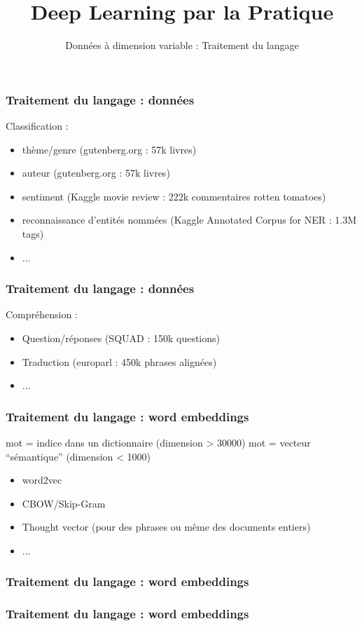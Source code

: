 \documentclass{formation}
\title{Deep Learning par la Pratique}
\subtitle{Données à dimension variable : Traitement du langage}
\begin{document}
\maketitle

\begin{frame}
  \frametitle{Traitement du langage : données}
  Classification :
  \begin{itemize}
  \item thème/genre (gutenberg.org : 57k livres)
  \item auteur (gutenberg.org : 57k livres)
  \item sentiment (Kaggle movie review : 222k commentaires rotten tomatoes)
  \item reconnaissance d'entités nommées (Kaggle Annotated Corpus for NER : 1.3M tags)
  \item ...
  \end{itemize}
\end{frame}

\begin{frame}
  \frametitle{Traitement du langage : données}
  Compréhension :
  \begin{itemize}
  \item Question/réponses (SQUAD : 150k questions)
  \item Traduction (europarl : 450k phrases alignées)
  \item ...
  \end{itemize}
\end{frame}

\begin{frame}
  \frametitle{Traitement du langage : word embeddings} 
  mot = indice dans un dictionnaire (dimension > 30000)
  \newline
  mot = vecteur ``sémantique'' (dimension < 1000) 
  \begin{itemize}
  \item word2vec
  \item CBOW/Skip-Gram
  \item Thought vector (pour des phrases ou même des documents entiers)
  \item ...
  \end{itemize}
\end{frame}

\begin{frame}
  \frametitle{Traitement du langage : word embeddings} 
\end{frame}

\begin{frame}
  \frametitle{Traitement du langage : word embeddings} 
  \begin{center}
    \href{http://vectors.nlpl.eu/repository/}{} \\
    \href{https://projector.tensorflow.org/}{}
  \end{center}
\end{frame}
\end{document}
